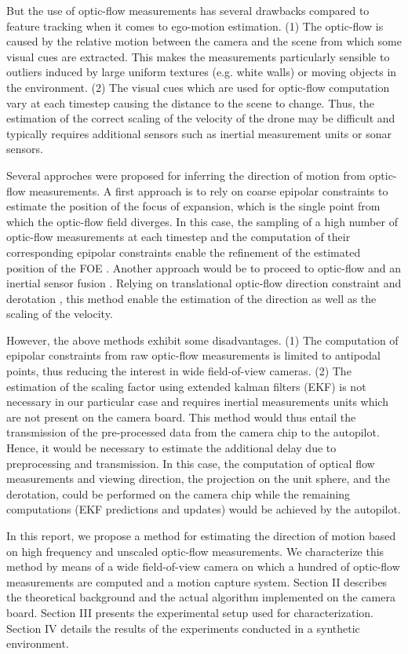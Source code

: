 But the use of optic-flow measurements has several drawbacks compared to feature tracking when it comes to ego-motion estimation. (1) The optic-flow is caused by the relative motion between the camera and the scene from which some visual cues are extracted. This makes the measurements particularly sensible to outliers induced by large uniform textures (e.g. white walls) or moving objects in the environment. (2) The visual cues which are used for optic-flow computation vary at each timestep causing the distance to the scene to change. Thus, the estimation of the correct scaling of the velocity of the drone may be difficult and typically requires additional sensors such as inertial measurement units \cite{ekf} or sonar sensors.

Several approches were proposed for inferring the direction of motion from optic-flow measurements. A first approach is to rely on coarse epipolar constraints to estimate the position of the focus of expansion, which is the single point from which the optic-flow field diverges. In this case, the sampling of a high number of optic-flow measurements at each timestep and the computation of their corresponding epipolar constraints enable the refinement of the estimated position of the FOE \cite{lim}. Another approach would be to proceed to optic-flow and an inertial sensor fusion \cite{ekf}. Relying on translational optic-flow direction constraint and derotation \cite{derotation}, this method enable the estimation of the direction as well as the scaling of the velocity.

However, the above methods exhibit some disadvantages. (1) The computation of epipolar constraints from raw optic-flow measurements is limited to antipodal points, thus reducing the interest in wide field-of-view cameras. (2) The estimation of the scaling factor using extended kalman filters (EKF) is not necessary in our particular case and requires inertial measurements units which are not present on the camera board. This method would thus entail the transmission of the pre-processed data from the camera chip to the autopilot. Hence, it would be necessary to estimate the additional delay due to preprocessing and transmission. In this case, the computation of optical flow measurements and viewing direction, the projection on the unit sphere, and the derotation, could be performed on the camera chip while the remaining computations (EKF predictions and updates) would be achieved by the autopilot.

In this report, we propose a method for estimating the direction of motion based on high frequency and unscaled optic-flow measurements. We characterize this method by means of a wide field-of-view camera on which a hundred of optic-flow measurements are computed and a motion capture system. Section II describes the theoretical background and the actual algorithm implemented on the camera board. Section III presents the experimental setup used for characterization. Section IV details the results of the experiments conducted in a synthetic environment.
